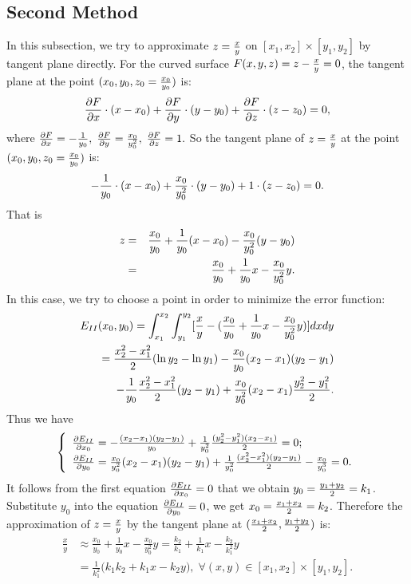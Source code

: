 \documentclass[conference]{IEEEtran}
\begin{document}
\subsection{Second Method}
\label{Second3.2}
In this subsection, we try to approximate $z={x\over y}$ on $[x_{1}, x_{2}]\times [y_{1}, y_{2}]$ by tangent plane directly. For the curved surface $F(x, y, z)=z-{x\over y}=0$,
the tangent plane at the point
$(x_{0}, y_{0}, z_{0}={x_{0}\over y_{0}})$ is:
$${\partial F\over \partial x}\cdot(x-x_{0})+{\partial F\over \partial y}\cdot(y-y_{0})+{\partial F\over \partial z}\cdot(z-z_{0})=0,$$
where ${\partial F\over \partial x}=-{1\over y_{0}}, \;{\partial F\over \partial y}={x_{0}\over y_{0}^{2}},\; {\partial F\over \partial z}=1.$
So the tangent plane of $z={x\over y}$ at the point $(x_{0}, y_{0}, z_{0}={x_{0}\over y_{0}})$ is:
$$-{1\over y_{0}}\cdot(x-x_{0})+{x_{0}\over y_{0}^{2}}\cdot(y-y_{0})+1\cdot(z-z_{0})=0.$$
That is
\begin{eqnarray}
z&=&{x_{0}\over y_{0}}+{1\over y_{0}}(x-x_{0})-{x_{0}\over y_{0}^{2}}(y-y_{0})\nonumber\\
&=&{x_{0}\over y_{0}}+{1\over y_{0}}x-{x_{0}\over y_{0}^{2}}y.\nonumber
\end{eqnarray}
In this case, we try to choose a point in order to minimize the error function:
\begin{eqnarray}
E_{II}(x_{0}, y_{0})=\int_{x_{1}}^{x_{2}}\int_{y_{1}}^{y_{2}}[{x\over y}-({x_{0}\over y_{0}}+{1\over y_{0}}x-{x_{0}\over y_{0}^{2}}y)]dx dy\nonumber\\
={x_{2}^{2}-x_{1}^{2}\over 2}(\ln y_{2}-\ln y_{1})-{x_{0}\over y_{0}}(x_{2}-x_{1})(y_{2}-y_{1})\nonumber\\
-{1\over y_{0}}{{x_{2}^{2}-x_{1}^{2}\over 2}}(y_{2}-y_{1})+{x_{0}\over y_{0}^{2}}(x_{2}-x_{1}){y_{2}^{2}-y_{1}^{2}\over 2}.\label{SecondError}
\end{eqnarray}
Thus we have
$$\left\{
\begin{array}{l}
{\partial E_{II}\over\partial x_{0}}=-{(x_{2}-x_{1})(y_{2}-y_{1})\over y_{0}}+{1\over y_{0}^{2}}{(y_{2}^{2}-y_{1}^{2})(x_{2}-x_{1})\over 2}=0;\\
{\partial E_{II}\over\partial y_{0}}={x_{0}\over y_{0}^{2}}(x_{2}-x_{1})(y_{2}-y_{1})+{1\over y_{0}^{2}}{(x_{2}^2-x_{1}^{2})(y_{2}-y_{1})\over 2}-{x_{0}\over y_{0}^{3}}=0.
\end{array}\right.$$
It follows from the first equation ${\partial E_{II}\over\partial x_{0}}=0$ that we obtain $y_{0}={y_{1}+y_{2}\over 2}=k_{1}$.
Substitute $y_{0}$ into the equation ${\partial E_{II}\over\partial y_{0}}=0$, we get $x_{0}={x_{1}+x_{2}\over 2}=k_{2}$. Therefore the approximation of $z={x\over y}$ by the tangent plane at $({x_{1}+x_{2}\over 2}, {y_{1}+y_{2}\over 2})$ is:
\begin{equation}
\begin{aligned}
\frac{x}{y} &\approx \frac{x_{0}}{y_{0}}+\frac{1}{y_{0}}x-\frac{x_{0}}{y_{0}^{2}}y = \frac{k_{2}}{k_{1}}+\frac{1}{k_{1}}x-\frac{k_{2}}{k_{1}^{2}}y \\
&= \frac{1}{k_{1}^{2}}\big(k_{1}k_{2}+k_{1}x-k_{2}y\big), \;\forall (x,y)\in [x_{1}, x_{2}]\times [y_{1}, y_{2}].
\end{aligned}
\label{SecondMethod}
\end{equation}
\end{document}
